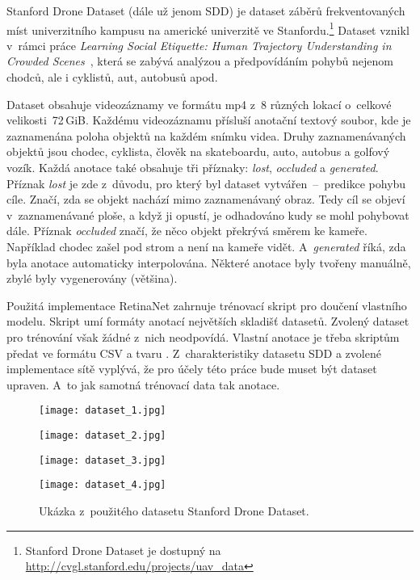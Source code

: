 Stanford Drone Dataset (dále už jenom SDD) je dataset záběrů frekventovaných míst univerzitního kampusu na americké univerzitě ve Stanfordu.\footnote{Stanford Drone Dataset je dostupný na \url{http://cvgl.stanford.edu/projects/uav_data}} Dataset vznikl v~rámci práce \textit{Learning Social Etiquette: Human Trajectory Understanding in Crowded Scenes}~\cite{paperSDD}, která se zabývá analýzou a předpovídáním pohybů nejenom chodců, ale i cyklistů, aut, autobusů apod.

Dataset obsahuje videozáznamy ve formátu mp4 z~8 různých lokací o~celkové velikosti~72\,GiB. Každému videozáznamu přísluší anotační textový soubor, kde je zaznamenána poloha objektů na každém snímku videa. Druhy zaznamenávaných objektů jsou chodec, cyklista, člověk na skateboardu, auto, autobus a golfový vozík. Každá anotace také obsahuje tři příznaky: \textit{lost}, \textit{occluded} a \textit{generated}. Příznak \textit{lost} je zde z~důvodu, pro který byl dataset vytvářen~--~predikce pohybu cíle. Značí, zda se objekt nachází mimo zaznamenávaný obraz. Tedy cíl se objeví v~zaznamenávané ploše, a když ji opustí, je odhadováno kudy se mohl pohybovat dále. Příznak \textit{occluded} značí, že něco objekt překrývá směrem ke kameře. Například chodec zašel pod strom a není na kameře vidět. A~\textit{generated} říká, zda byla anotace automaticky interpolována. Některé anotace byly tvořeny manuálně, zbylé byly vygenerovány (většina).

Použitá implementace RetinaNet zahrnuje trénovací skript  pro doučení vlastního modelu. Skript umí formáty anotací největších skladišť datasetů. Zvolený dataset pro trénování však žádné z~nich neodpovídá. Vlastní anotace je třeba skriptům předat ve formátu CSV a tvaru . Z~charakteristiky datasetu SDD a zvolené implementace sítě vyplývá, že pro účely této práce bude muset být dataset upraven. A~to jak samotná trénovací data tak anotace.

\begin{figure}[H]
    \centering
    \begin{minipage}{.5\textwidth}
        \centering
        \texttt{[image: dataset\_1.jpg]}
    \end{minipage}%
    \begin{minipage}{.5\textwidth}
        \centering
        \texttt{[image: dataset\_2.jpg]}
    \end{minipage}
    \begin{minipage}{.5\textwidth}
        \centering
        \texttt{[image: dataset\_3.jpg]}
    \end{minipage}%
    \begin{minipage}{.5\textwidth}
        \centering
        \texttt{[image: dataset\_4.jpg]}
    \end{minipage}
    \caption[Ukázka ze datasetu Stanford Drone Dataset]{Ukázka z~použitého datasetu Stanford Drone Dataset.}
\end{figure}

